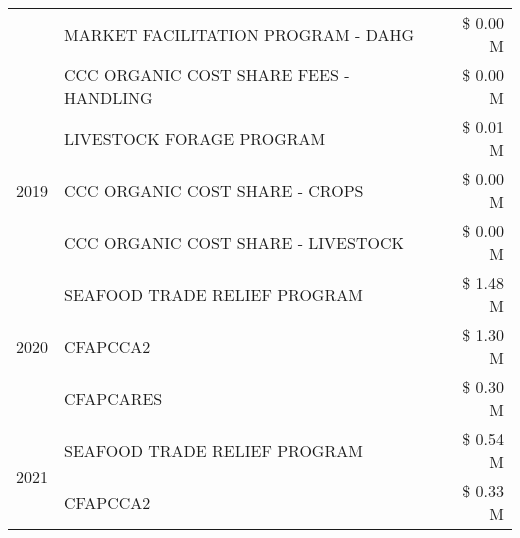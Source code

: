 \begin{tabular}{llr}
 & MARKET FACILITATION PROGRAM - DAHG & \$ 0.00 M \\
 & CCC ORGANIC COST SHARE FEES - HANDLING & \$ 0.00 M \\
\cline{1-3}
\multirow[t]{3}{*}{2019} & LIVESTOCK FORAGE PROGRAM & \$ 0.01 M \\
 & CCC ORGANIC COST SHARE - CROPS & \$ 0.00 M \\
 & CCC ORGANIC COST SHARE - LIVESTOCK & \$ 0.00 M \\
\cline{1-3}
\multirow[t]{3}{*}{2020} & SEAFOOD TRADE RELIEF PROGRAM & \$ 1.48 M \\
 & CFAPCCA2 & \$ 1.30 M \\
 & CFAPCARES & \$ 0.30 M \\
\cline{1-3}
\multirow[t]{2}{*}{2021} & SEAFOOD TRADE RELIEF PROGRAM & \$ 0.54 M \\
 & CFAPCCA2 & \$ 0.33 M \\
\cline{1-3}
\bottomrule
\end{tabular}
